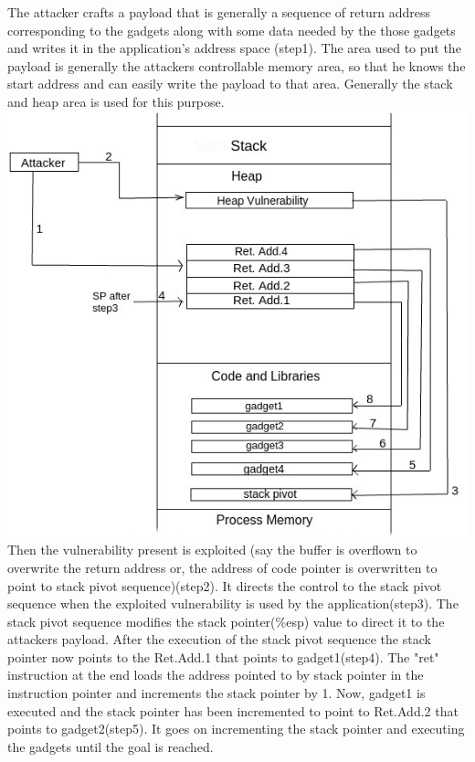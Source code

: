 \documentclass{article}
\begin{document}
\begin{multicols}{2}
	The attacker crafts a payload that is generally a sequence of return address corresponding to the gadgets along with some data needed by the those gadgets and writes it in the application's address space (step1). The area used to put the payload is generally the attackers controllable memory area, so that he knows the start address and can easily write the payload to that area. Generally the stack and heap area is used for this purpose.\break \break \includegraphics[scale=.40]{rop.jpg} Then the vulnerability present is exploited (say the buffer is overflown to overwrite the return address or, the address of code pointer is overwritten to point to stack pivot sequence)(step2). It directs the control to the stack pivot sequence when the exploited vulnerability is used by the application(step3). The stack pivot sequence modifies the stack pointer(\%esp) value to direct it to the attackers payload. After the execution of the stack pivot sequence the stack pointer now points to the Ret.Add.1 that points to gadget1(step4). The "ret" instruction at the end loads the address pointed to by stack pointer in the instruction pointer and increments the stack pointer by 1. Now, gadget1 is executed and the stack pointer has been incremented to point to Ret.Add.2 that points to gadget2(step5). It goes on incrementing the stack pointer and executing the gadgets until the goal is reached.
	

\end{multicols}
\end{document}
